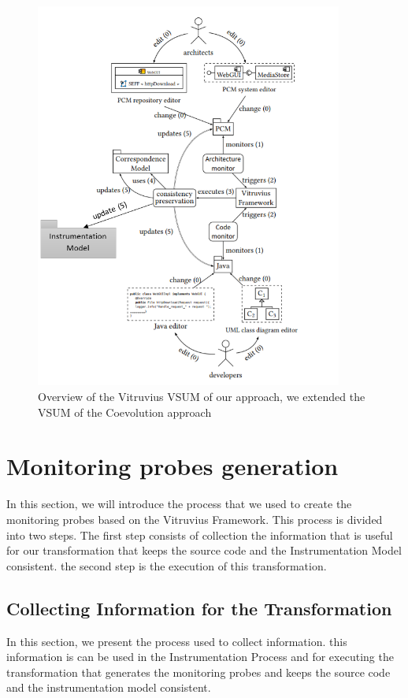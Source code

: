 \begin{figure}[h]
\centering
\includegraphics[width=0.9\textwidth]{figures/extended_vsum}
\caption{Overview of the Vitruvius VSUM of our approach, we extended the VSUM of the Coevolution approach}
\label{fig:extended_vsum}
\end{figure}

\section{Monitoring probes generation}
\label{sec:Monitoring probes generation}
In this section, we will introduce the process that we used to create the monitoring probes based on the Vitruvius Framework. This process is divided into two steps. The first step consists of collection the information that is useful for our transformation that keeps the source code and the Instrumentation Model consistent. the second step is the execution of this transformation.

\subsection{Collecting Information for the Transformation}
\label{sec:Collecting Information for the Transformation}
In this section, we present the process used to collect information. this information is can be used in the Instrumentation Process and for executing the transformation that generates the monitoring probes and keeps the source code and the instrumentation model consistent.

